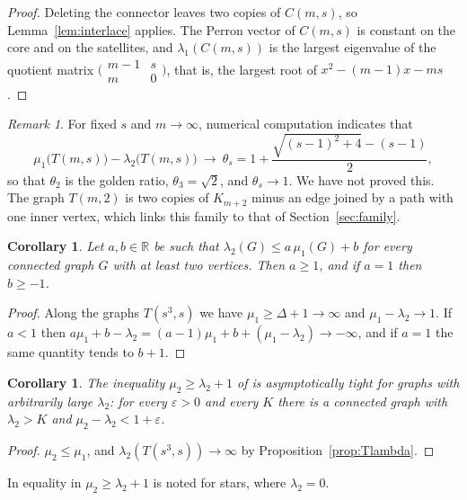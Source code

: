 \documentclass[11pt]{amsart}
\newtheorem{corollary}[theorem]{Corollary}
\theoremstyle{definition}
\theoremstyle{remark}
\newtheorem{remark}[theorem]{Remark}
\newcommand{\R}{\mathbb{R}}
\begin{document}
\begin{proof}
Deleting the connector leaves two copies of $C(m,s)$, so Lemma~\ref{lem:interlace} applies. The
Perron vector of $C(m,s)$ is constant on the core and on the satellites, and
$\lambda_1(C(m,s))$ is the largest eigenvalue of the quotient matrix
$\bigl(\begin{smallmatrix}m-1&s\\ m&0\end{smallmatrix}\bigr)$, that is, the largest root of
$x^2-(m-1)x-ms$.
\end{proof}

\begin{remark}\label{rem:theta}
For fixed $s$ and $m\to\infty$, numerical computation indicates that
\[
\mu_1\bigl(T(m,s)\bigr)-\lambda_2\bigl(T(m,s)\bigr)\ \longrightarrow\ \theta_s
=1+\frac{\sqrt{(s-1)^2+4}-(s-1)}{2},
\]
so that $\theta_2$ is the golden ratio, $\theta_3=\sqrt2$, and $\theta_s\to1$. We have not
proved this. The graph $T(m,2)$ is two copies of $K_{m+2}$ minus an edge joined by a path with
one inner vertex, which links this family to that of Section~\ref{sec:family}.
\end{remark}

\begin{corollary}\label{cor:linear}
Let $a,b\in\R$ be such that $\lambda_2(G)\le a\,\mu_1(G)+b$ for every connected graph $G$ with at
least two vertices. Then $a\ge1$, and if $a=1$ then $b\ge-1$.
\end{corollary}

\begin{proof}
Along the graphs $T(s^3,s)$ we have $\mu_1\ge\Delta+1\to\infty$ and $\mu_1-\lambda_2\to1$. If
$a<1$ then $a\mu_1+b-\lambda_2=(a-1)\mu_1+b+(\mu_1-\lambda_2)\to-\infty$, and if $a=1$ the same
quantity tends to $b+1$.
\end{proof}

\begin{corollary}
The inequality $\mu_2\ge\lambda_2+1$ of \cite[Theorem~1]{Cazenave} is asymptotically tight for
graphs with arbitrarily large $\lambda_2$: for every $\varepsilon>0$ and every $K$ there is a
connected graph with $\lambda_2>K$ and $\mu_2-\lambda_2<1+\varepsilon$.
\end{corollary}

\begin{proof}
$\mu_2\le\mu_1$, and $\lambda_2(T(s^3,s))\to\infty$ by Proposition~\ref{prop:Tlambda}.
\end{proof}

In \cite{Cazenave} equality in $\mu_2\ge\lambda_2+1$ is noted for stars, where $\lambda_2=0$.
\end{document}
